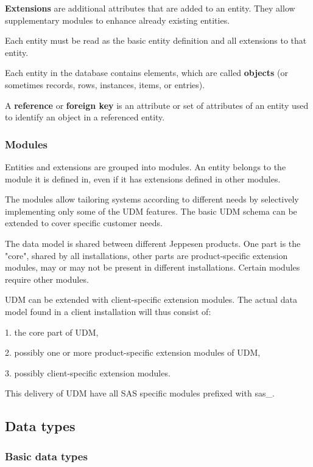 \documentclass[techdoc]{nobs}   %
\begin{document}
{\bf Extensions} are additional attributes that are added to an entity. They
allow supplementary modules to enhance already existing entities.

Each entity must be read as the basic entity definition and all extensions
to that entity.

Each entity in the database contains elements, which are called {\bf objects}
(or sometimes records, rows, instances, items, or entries).

A {\bf reference} or {\bf foreign key} %
is an attribute or set of attributes of an entity
used to identify an object in a referenced entity.


\subsubsection{Modules}
\label{sec:Modules}

Entities and extensions are grouped into modules.
An entity belongs to the module it is defined in, even if it has extensions
defined in other modules.

The modules allow tailoring systems according to different needs by selectively
implementing only some of the UDM features. The basic UDM schema can be extended
to cover specific customer needs.

The data model is shared between different Jeppesen products.
One part is the "core", shared by all installations,
other parts are product-specific extension modules, may or may not be
present in different installations.
Certain modules require other modules. %

UDM can be extended with client-specific extension modules.
The actual data model found in a client installation
will thus consist of:

1. the core part of UDM,

2. possibly one or more product-specific extension modules of UDM,

3. possibly client-specific extension modules.

This delivery of UDM have all SAS specific modules prefixed with sas\_.


\subsection{Data types}
\label{sec:types}

\subsubsection{Basic data types}
\label{sec:Basic data types}
\end{document}
